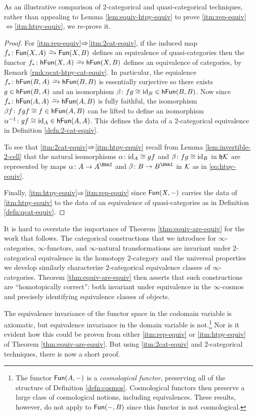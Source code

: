   As an illustrative comparison of 2-categorical and quasi-categorical techniques, rather than appealing to Lemma \ref{lem:equiv-htpy-equiv} to prove \ref{itm:rep-equiv}$\Leftrightarrow$\ref{itm:htpy-equiv}, we re-prove it.
  \begin{proof}
    For \ref{itm:rep-equiv}$\Rightarrow$\ref{itm:2cat-equiv}, if the induced map $f_* \colon \Fun(X,A) \we \Fun(X,B)$  defines an equivalence of quasi-categories then the functor $f_* \colon \hFun(X,A) \we \hFun(X,B)$ defines an equivalence of categories, by Remark \ref{rmk:qcat-htpy-cat-equiv}. In particular, the equialence $f_* \colon \hFun(B,A) \we \hFun(B,B)$ is essentially surjective so there exists $g \in {\mathord{\mathsf{hFun}}}(B,A)$ and an isomorphism $\beta \colon fg \cong \textup{id}_B \in {\mathord{\mathsf{hFun}}}(B,B)$. Now since $f_* \colon \hFun(A,A) \we \hFun(A,B)$ is fully faithful, the isomorphism $\beta f \colon fgf \cong f \in {\mathord{\mathsf{hFun}}}(A,B)$ can be lifted to define an isomorphism $\alpha^{-1} \colon gf \cong \textup{id}_A \in {\mathord{\mathsf{hFun}}}(A,A)$. This defines the data of a 2-categorical equivalence in Definition \ref{defn:2-cat-equiv}.

  To see that \ref{itm:2cat-equiv}$\Rightarrow$\ref{itm:htpy-equiv} recall from Lemma \ref{lem:invertible-2-cell} that the natural isomorphisms $\alpha \colon \textup{id}_A \cong gf$ and $\beta \colon fg \cong \textup{id}_B$ in $\mathfrak{h}{\mathord{\mathcal{K}}}$ are represented by maps $\alpha \colon A \to A^\iso$ and $\beta \colon B \to B^\iso$ in ${\mathord{\mathcal{K}}}$ as in \eqref{eq:htpy-equiv}.

  Finally, \ref{itm:htpy-equiv}$\Rightarrow$\ref{itm:rep-equiv} since ${\mathord{\mathsf{Fun}}}(X,-)$ carries the data of \ref{itm:htpy-equiv} to the data of an equivalence of quasi-categories as in  Definition \ref{defn:qcat-equiv}.
  \end{proof}

  It is hard to overstate the importance of Theorem \ref{thm:equiv-are-equiv} for the work that follows. The categorical constructions that we introduce for $\infty$-categories, $\infty$-func\-tors, and $\infty$-natural transformations are invariant under 2-cat\-e\-go\-ri\-cal equivalence in the homotopy 2-category and the universal properties we develop similarly characterize 2-categorical equivalence classes of $\infty$-cat\-e\-go\-ries. Theorem \ref{thm:equiv-are-equiv} then asserts that such constructions are ``homotopically correct'': both invariant under equivalence in the $\infty$-cosmos and precisely identifying equivalence classes of objects.


  The equivalence invariance of the functor space in the codomain variable is axiomatic, but equivalence invariance in the domain variable is not.\footnote{The functor ${\mathord{\mathsf{Fun}}}(A,-)$ is a \emph{cosmological functor}, preserving all of the structure of Definition \ref{defn:cosmos}. Cosmological functors then preserve a large class of cosmological notions, including equivalences. These results, however, %
  do not apply to ${\mathord{\mathsf{Fun}}}(-,B)$ since this functor is not cosmological.} Nor is it evident how this could be proven from either \ref{itm:rep-equiv} or \ref{itm:htpy-equiv} of Theorem \ref{thm:equiv-are-equiv}. But using \ref{itm:2cat-equiv} and 2-categorical techniques, there is now a short proof.

